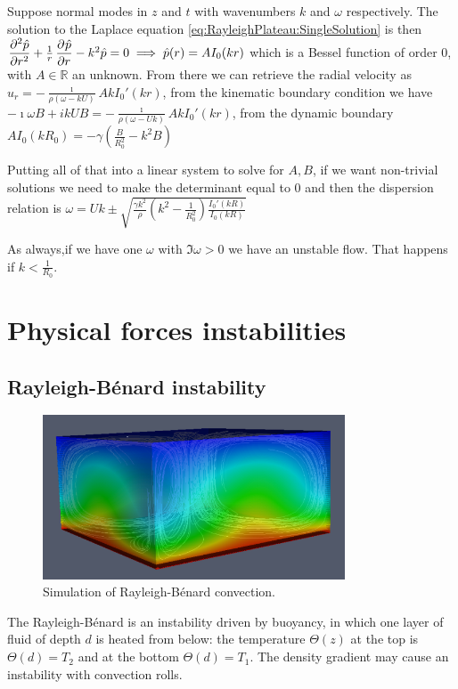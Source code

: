 \documentclass[palatino]{epflnotes}
\begin{document}
Suppose normal modes in $z$ and $t$ with wavenumbers $k$ and $ω$ respectively. The solution to the Laplace equation \eqref{eq:RayleighPlateau:SingleSolution} is then \( \dpd[2]{\hat{p}}{r} + \frac{1}{r} \dpd{\hat{p}}{r} - k^2 \hat{p} = 0 \implies \hat{p}(r) = AI_0(kr)\) which is a Bessel function of order 0, with $A ∈ ℝ$ an unknown. From there we can retrieve the radial velocity as \( \hat{u}_r = - \frac{\imath}{ρ(ω -k U)} AkI_0'(kr) \), from the kinematic boundary condition we have \( -\imath ω B + ik UB = - \frac{\imath}{ρ(ω-Uk)} AkI_0'(kr) \), from the dynamic boundary \(AI_0(kR_0) = - γ\left(\frac{B}{R_0^2} - k^2B\right)\)

Putting all of that into a linear system to solve for $A,B$, if we want non-trivial solutions we need to make the determinant equal to $0$ and then the dispersion relation is \( ω = Uk \pm \sqrt{\frac{γk^2}{ρ} \left(k^2 - \frac{1}{R^2_0}\right) \frac{I_0'(kR)}{I_0(kR)}} \)

As always,if we have one $ω$ with $\Im ω > 0$ we have an unstable flow. That happens if $k < \frac{1}{R_0}$.

\chapter{Physical forces instabilities}

\section{Rayleigh-Bénard instability}

\begin{figure}[hbtp]
\centering
\includegraphics[width=0.8\textwidth]{img/RayleighBernardConvection.png}
\caption{Simulation of Rayleigh-Bénard convection.}
\label{fig:RayleighBenard:Sim}
\end{figure}

The Rayleigh-Bénard is an instability driven by buoyancy, in which one layer of fluid of depth $d$ is heated from below: the temperature $Θ(z)$ at the top is $Θ(d) = T_2$ and at the bottom $Θ(d) = T_1$. The density gradient may cause an instability with convection rolls.
\end{document}
